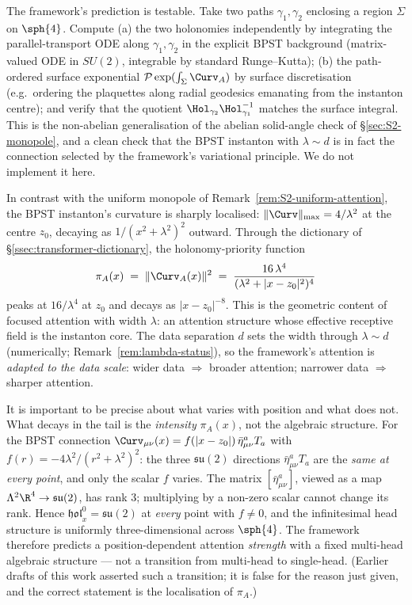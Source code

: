 The framework's prediction is testable. Take two paths
$\gamma_1,\gamma_2$ enclosing a region $\Sigma$ on $\sph{4}$.
Compute (a) the two holonomies independently by integrating the
parallel-transport ODE along $\gamma_1,\gamma_2$ in the explicit
BPST background (matrix-valued ODE in $SU(2)$, integrable by
standard Runge--Kutta); (b) the path-ordered surface exponential
$\mathcal{P}\exp(\int_\Sigma\Curv_A)$ by surface discretisation
(e.g.\ ordering the plaquettes along radial geodesics emanating from
the instanton centre); and verify that the quotient
$\Hol_{\gamma_2}\Hol_{\gamma_1}^{-1}$ matches the surface integral.
This is the non-abelian generalisation of the abelian
solid-angle check of \S\ref{sec:S2-monopole}, and a clean check that
the BPST instanton with $\lambda\sim d$ is in fact the connection
selected by the framework's variational principle. We do not
implement it here.

\begin{remark}
\label{rem:S4-localised-attention}
In contrast with the uniform monopole of
Remark~\ref{rem:S2-uniform-attention}, the BPST instanton's
curvature is sharply localised: $\|\Curv\|_{\max}=4/\lambda^2$ at
the centre $z_0$, decaying as $1/(x^2+\lambda^2)^2$ outward. Through
the dictionary of \S\ref{ssec:transformer-dictionary}, the
holonomy-priority function
\[
   \pi_A(x)\;=\;\|\Curv_A(x)\|^2
   \;=\;\frac{16\,\lambda^4}{(\lambda^2+|x-z_0|^2)^4}
\]
peaks at $16/\lambda^4$ at $z_0$ and decays as $|x-z_0|^{-8}$. This
is the geometric content of focused attention with width $\lambda$:
an attention structure whose effective receptive field is the
instanton core. The data separation $d$ sets the width through
$\lambda\sim d$ (numerically; Remark~\ref{rem:lambda-status}), so the framework's
attention is \emph{adapted to the data scale}: wider data
$\Rightarrow$ broader attention; narrower data $\Rightarrow$ sharper
attention.

It is important to be precise about what varies with position and
what does not. What decays in the tail is the \emph{intensity}
$\pi_A(x)$, not the algebraic structure. For the BPST connection
$\Curv_{\mu\nu}(x)=f(|x-z_0|)\,\bar\eta^a_{\mu\nu}T_a$ with
$f(r)=-4\lambda^2/(r^2+\lambda^2)^2$: the three
$\mathfrak{su}(2)$ directions $\bar\eta^a_{\mu\nu}T_a$ are the
\emph{same at every point}, and only the scalar $f$ varies. The
matrix $[\bar\eta^a_{\mu\nu}]$, viewed as a map
$\Lambda^2\R^4\to\mathfrak{su}(2)$, has rank $3$; multiplying by a
non-zero scalar cannot change its rank. Hence
$\mathfrak{hol}^0_x=\mathfrak{su}(2)$ at \emph{every} point with
$f\neq 0$, and the infinitesimal head structure is uniformly
three-dimensional across $\sph{4}$. The framework therefore predicts
a position-dependent attention \emph{strength} with a fixed
multi-head algebraic structure --- not a transition from multi-head
to single-head. (Earlier drafts of this work asserted such a
transition; it is false for the reason just given, and the correct
statement is the localisation of $\pi_A$.)
\end{remark}

